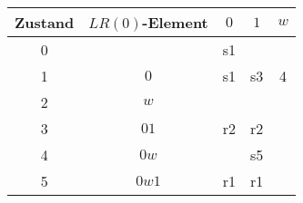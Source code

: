 \begin{center}
\begin{tabular}{|c|c|cc|c|}
\hline
Zustand&$LR(0)$-Element&$0$&$1$&$w$\\
\hline
0&$\boxed{\phantom{0}}$&s1&&\\
1&$\boxed{0}$&s1&s3&4\\
2&$\boxed{w}$&&&\\
3&$\boxed{01}$&r2&r2&\\
4&$\boxed{0w}$&&s5&\\
5&$\boxed{0w1}$&r1&r1&\\
\hline
\end{tabular}
\end{center}
